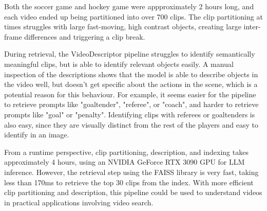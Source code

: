 Both the soccer game and hockey game were appproximately 2 hours long, and each video ended up being partitioned into over 700 clips.
The clip partitioning at times struggles with large fast-moving, high contrast objects, creating large inter-frame differences and triggering a clip break.

During retrieval, the VideoDescriptor pipeline struggles to identify semantically meaningful clips, but is able to identify relevant objects easily.
A manual inspection of the descriptions shows that the model is able to describe objects in the video well, but doesn't get specific about the actions in the scene, which is a potential reason for this behaviour.
For example, it seems easier for the pipeline to retrieve prompts like "goaltender", "referee", or "coach", and harder to retrieve prompts like "goal" or "penalty".
Identifying clips with referees or goaltenders is also easy, since they are visually distinct from the rest of the players and easy to identify in an image.

From a runtime perspective, clip partitioning, description, and indexing takes approximately 4 hours, using an NVIDIA GeForce RTX 3090 GPU for LLM inference.
However, the retrieval step using the FAISS library is very fast, taking less than 170ms to retrieve the top 30 clips from the index.
With more efficient clip partitioning and description, this pipeline could be used to understand videos in practical applications involving video search.

